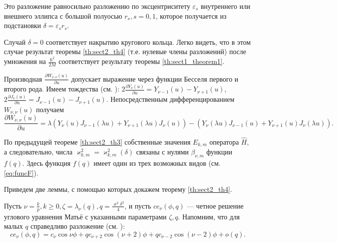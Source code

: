 \begin{remark}
Это разложение равносильно разложению по эксцентриситету $\varepsilon_s$ внутреннего или внешнего эллипса с большой полуосью $r_s, s = 0, 1$, которое получается из подстановки $\delta = \varepsilon_s r_s$.
\end{remark}

\begin{remark}
Случай $\delta=0$ соответствует накрытию кругового кольца. Легко видеть, что в этом случае результат теоремы \ref{th:sect2_th4}  (т.е. нулевые члены разложений) после умножения на $\frac{\hbar^2}{2M}$ соответствует результату теоремы \ref{th:sect1_theorem1}.
\end{remark}

\begin{remark}
Производная $\frac{\partial W_{\nu, \nu}(u)}{\partial u}$ допускает выражение через функции Бесселя первого и второго рода.
Имеем тождества (см. \cite{wref5}): 
$2\frac{\partial Y_\nu(u)}{\partial u} = Y_{\nu-1}(u) - Y_{\nu+1}(u)$, $2\frac{\partial J_\nu(u)}{\partial u} = J_{\nu-1}(u) - J_{\nu+1}(u)$.
Непосредственным дифференцированием 
$W_{\nu, \nu}(u)$ получаем
$$\frac{\partial W_{\nu, \nu}(u)
}{\partial u} = 
\lambda (Y_\nu(u) J_{\nu-1}(\lambda u)
+  Y_{\nu+1}(\lambda u) J_\nu(u)) - 
 (Y_\nu(\lambda u) J_{\nu-1}(u)  + 
 Y_{\nu+1}(u) J_\nu(\lambda u) ).$$
 \end{remark}

По предыдущей теореме \ref{th:sect2_th3} собственные значения $E_{k, m}$ оператора $\hat{H}$, а следовательно, числа $\varkappa^2_{k,m} = \varkappa^2_{k,m}(\delta)$ связаны с нулями $\beta_{\nu, m}$ функции $f(q)$. Здесь функция $f(q)$ имеет один из трех возможных видов (см. \eqref{eq:funcF}).

Приведем две леммы, с помощью которых докажем теорему \ref{th:sect2_th4}.
\medskip

Пусть $\nu = \frac{k}{p}, k \geq 0, \zeta = \lambda_\nu(q), q=\frac{\varkappa^2 \delta^2}{4}$, и пусть $ce_\nu(\phi, q)$ --- четное решение углового уравнения Матьё с указанными параметрами $\zeta, q$. Напомним, что для малых $q$ справедливо разложение (см. \cite[\S~2.2, с.~122---124]{wref12}):
$$ce_\nu(\phi, q) = c_\nu \cos{\nu \phi} + q c_{\nu+2} \cos{(\nu+2) \phi} +q c_{\nu-2} \cos{(\nu-2) \phi} + o(q).$$ 

